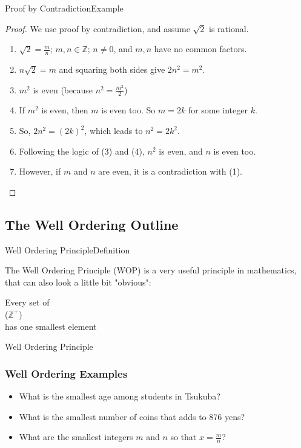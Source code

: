 \begin{frame}{Proof by Contradiction}{Example}

  \begin{proof}
    We use proof by contradiction, and assume $\sqrt{2}$ is rational.
  \begin{enumerate}
  \item $\sqrt{2} = \frac{m}{n}$; $m,n \in \mathbb{Z}$; $n\neq 0$, and $m,n$ have no common factors.
  \item $n\sqrt{2} = m$ and squaring both sides give $2n^2 = m^2$.
  \item $m^2$ is even (because $n^2 = \frac{m^2}{2}$)
  \item If $m^2$ is even, then $m$ is even too. So $m = 2k$ for some integer $k$.
  \item So, $2n^2 = (2k)^2$, which leads to $n^2 = 2k^2$.
  \item Following the logic of (3) and (4), $n^2$ is even, and $n$ is even too.
  \item However, if $m$ and $n$ are even, it is a contradiction with (1).
  \end{enumerate}
  \end{proof}
\end{frame}



\subsection{The Well Ordering Outline}

\begin{frame}{Well Ordering Principle}{Definition}

  The Well Ordering Principle (WOP) is a very useful principle in mathematics, that can also look a little bit "obvious":\bigskip

  {\Large
  \begin{center}
    Every  set of\\
     ($\mathbb{Z}^+$)\\
    has \alert{one smallest element}
  \end{center}}
\end{frame}

\begin{frame}{Well Ordering Principle}
  \frametitle{Well Ordering Examples}
    \begin{itemize}
      \item What is the smallest age among students in Tsukuba?
      \bigskip

      \item What is the smallest number of coins that adds to 876 yens?
      \bigskip

      \item What are the smallest integers $m$ and $n$ so that $x = \frac{m}{n}$?
    \end{itemize}
\end{frame}

